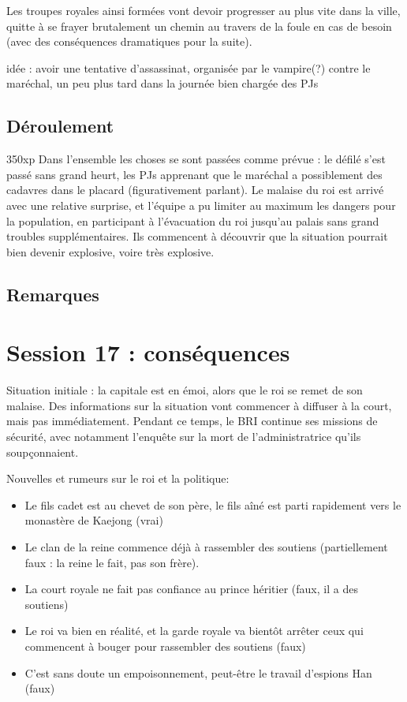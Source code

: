 \documentclass[10pt,a4paper]{book}
\begin{document}
Les troupes royales ainsi formées vont devoir progresser au plus vite dans la ville, quitte à se frayer brutalement un chemin au travers de la foule en cas de besoin (avec des conséquences dramatiques pour la suite).

idée : avoir une tentative d'assassinat, organisée par le vampire(?) contre le maréchal, un peu plus tard dans la journée bien chargée des PJs

\subsection{Déroulement}
350xp
Dans l'ensemble les choses se sont passées comme prévue : le défilé s'est passé sans grand heurt, les PJs apprenant que le maréchal a possiblement des cadavres dans le placard (figurativement parlant). Le malaise du roi est arrivé avec une relative surprise, et l'équipe a pu limiter au maximum les dangers pour la population, en participant à l'évacuation du roi jusqu'au palais sans grand troubles supplémentaires. Ils commencent à découvrir que la situation pourrait bien devenir explosive, voire très explosive.
\subsection{Remarques}
\section{Session 17 : conséquences}
Situation initiale : la capitale est en émoi, alors que le roi se remet de son malaise. Des informations sur la situation vont commencer à diffuser à la court, mais pas immédiatement. Pendant ce temps, le BRI continue ses missions de sécurité, avec notamment l'enquête sur la mort de l'administratrice qu'ils soupçonnaient.

Nouvelles et rumeurs sur le roi et la politique:
\begin{itemize}
\item Le fils cadet est au chevet de son père, le fils aîné est parti rapidement vers le monastère de Kaejong (vrai) 
\item Le clan de la reine commence déjà à rassembler des soutiens (partiellement faux : la reine le fait, pas son frère).
\item La court royale ne fait pas confiance au prince héritier (faux, il a des soutiens)
\item Le roi va bien en réalité, et la garde royale va bientôt arrêter ceux qui commencent à bouger pour rassembler des soutiens (faux)
\item C'est sans doute un empoisonnement, peut-être le travail d'espions Han (faux)
\end{itemize}
\end{document}
